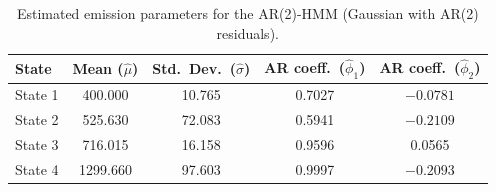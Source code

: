 \begin{table}[ht]
\centering
\begin{tabular}{lcccc}
\hline
State & Mean ($\hat{\mu}$) & Std.\ Dev.\ ($\hat{\sigma}$) & AR coeff.\ ($\hat{\phi}_1$) & AR coeff.\ ($\hat{\phi}_2$) \\
\hline
State 1 &  400.000 &  10.765 &  0.7027 & $-0.0781$ \\
State 2 &  525.630 &  72.083 &  0.5941 & $-0.2109$ \\
State 3 &  716.015 &  16.158 &  0.9596 &  0.0565  \\
State 4 & 1299.660 &  97.603 &  0.9997 & $-0.2093$ \\
\hline
\end{tabular}
\caption{Estimated emission parameters for the AR(2)-HMM (Gaussian with AR(2) residuals).}
\label{tab:ar_2_hmm_emissions}
\end{table}
